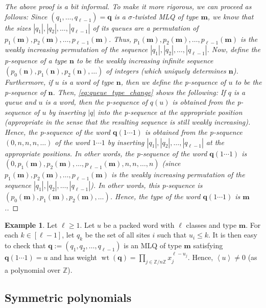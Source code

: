 \documentclass[reqno]{amsart}
\newcommand{\0}{\phantom{c}}
\newcommand{\swt}[1]{\left\langle #1 \right\rangle} %
\DeclareMathOperator{\wt}{wt} %
\newcommand{\mm}{\mathbf{m}}
\newcommand{\nn}{\mathbf{n}}
\newcommand{\qq}{\mathbf{q}}
\newcommand{\ZZ}{\mathbb{Z}}
\let\prodnonlimits\prod
\renewcommand{\prod}{\prodnonlimits\limits}
\newenvironment{verlong}{}{}
\newcommand{\abs}[1]{\left| #1 \right|}
\newcommand{\tup}[1]{\left( #1 \right)}
\newcommand{\ive}[1]{\left[ #1 \right]}
\newcommand{\defn}[1]{{\color{darkred}\emph{#1}}} %
\theoremstyle{plain}
\theoremstyle{definition}
\newtheorem{example}[thm]{Example}
\numberwithin{equation}{section}
\begin{document}
\begin{verlong}
\begin{proof}
[The above proof is a bit informal. To make it more rigorous, we can proceed as follows: Since $\tup{q_1, \ldots, q_{\ell-1}} = \qq$ is a $\sigma$-twisted MLQ of type $\mm$, we know that the sizes $\abs{q_1}, \abs{q_2}, \ldots, \abs{q_{\ell-1}}$ of its queues are a permutation of $p_1(\mm), p_2(\mm), \ldots, p_{\ell-1}(\mm)$. Thus, $p_1(\mm), p_2(\mm), \ldots, p_{\ell-1}(\mm)$ is the weakly increasing permutation of the sequence $\abs{q_1}, \abs{q_2}, \ldots, \abs{q_{\ell-1}}$.
Now, define the \defn{p-sequence} of a type $\nn$ to be the weakly increasing infinite sequence $\tup{p_0(\nn), p_1(\nn), p_2(\nn), \ldots}$ of integers (which uniquely determines $\nn$). Furthermore, if $u$ is a word of type $\nn$, then we define the p-sequence of $u$ to be the p-sequence of $\nn$. Then, \eqref{eq:queue_type_change} shows the following: If $q$ is a queue and $u$ is a word, then the p-sequence of $q(u)$ is obtained from the p-sequence of $u$ by inserting $\abs{q}$ into the p-sequence at the appropriate position (appropriate in the sense that the resulting sequence is still weakly increasing). Hence, the p-sequence of the word $\qq (1 \dotsm 1)$ is obtained from the p-sequence $\tup{0, n, n, n, \ldots}$ of the word $1 \dotsm 1$ by inserting $\abs{q_1}, \abs{q_2}, \ldots, \abs{q_{\ell-1}}$ at the appropriate positions. In other words, the p-sequence of the word $\qq (1 \dotsm 1)$ is $\tup{0, p_1(\mm), p_2(\mm), \ldots, p_{\ell-1}(\mm), n, n, \ldots, n}$ (since $p_1(\mm), p_2(\mm), \ldots, p_{\ell-1}(\mm)$ is the weakly increasing permutation of the sequence $\abs{q_1}, \abs{q_2}, \ldots, \abs{q_{\ell-1}}$). In other words, this p-sequence is $\tup{p_0(\mm), p_1(\mm), p_2(\mm), \ldots}$. Hence, the type of the word $\qq (1 \dotsm 1)$ is $\mm$.]
\end{proof}
\end{verlong}

\begin{example}
Let $\ell \geq 1$.
Let $u$ be a packed word with $\ell$ classes and type $\mm$.
For each $k \in \ive{\ell-1}$, let $q_k$ be the set of all sites $i$ such that $u_i \leq k$.
It is then easy to check that $\qq := \tup{q_1, q_2, \ldots, q_{\ell-1}}$ is an
MLQ of type $\mm$ satisfying $\qq(1 \dotsm 1) = u$ and has weight
$\wt(\qq) = \prod_{j \in \ZZ / n \ZZ} x_j^{\ell - u_j}$.
Hence, $\swt{u} \neq 0$ (as a polynomial over $\ZZ$).
\end{example}




\subsection{Symmetric polynomials}
\end{document}

